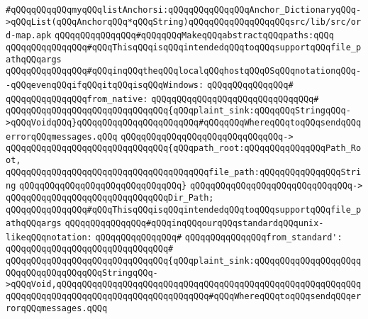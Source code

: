 \verb|#qQQqqQQqqQQqmyqQQqlistAnchorsi:qQQqqQQqqQQqqQQqAnchor_DictionaryqQQq->qQQqList(qQQqAnchorqQQq*qQQqString)qQQqqQQqqQQqqQQqqQQqsrc/lib/src/ord-map.apk|\newline
\newline
\newline
\verb|qQQqqQQqqQQqqQQq#qQQqqQQqMakeqQQqabstractqQQqpaths:qQQq|\newline
\newline
\verb|qQQqqQQqqQQqqQQq#qQQqThisqQQqisqQQqintendedqQQqtoqQQqsupportqQQqfile_pathqQQqargs|\newline
\verb|qQQqqQQqqQQqqQQq#qQQqinqQQqtheqQQqlocalqQQqhostqQQqOSqQQqnotationqQQq--qQQqevenqQQqifqQQqitqQQqisqQQqWindows:|\newline
\verb|qQQqqQQqqQQqqQQq#|\newline
\verb|qQQqqQQqqQQqqQQqfrom_native:|\newline
\verb|qQQqqQQqqQQqqQQqqQQqqQQqqQQqqQQq#|\newline
\verb|qQQqqQQqqQQqqQQqqQQqqQQqqQQqqQQq{qQQqplaint_sink:qQQqqQQqStringqQQq->qQQqVoidqQQq}qQQqqQQqqQQqqQQqqQQqqQQq#qQQqqQQqWhereqQQqtoqQQqsendqQQqerrorqQQqmessages.qQQq|\newline
\verb|qQQqqQQqqQQqqQQqqQQqqQQqqQQqqQQq->|\newline
\verb|qQQqqQQqqQQqqQQqqQQqqQQqqQQqqQQq{qQQqpath_root:qQQqqQQqqQQqqQQqPath_Root,|\newline
\verb|qQQqqQQqqQQqqQQqqQQqqQQqqQQqqQQqqQQqqQQqfile_path:qQQqqQQqqQQqqQQqString|\newline
\verb|qQQqqQQqqQQqqQQqqQQqqQQqqQQqqQQq}|\newline
\verb|qQQqqQQqqQQqqQQqqQQqqQQqqQQqqQQq->|\newline
\verb|qQQqqQQqqQQqqQQqqQQqqQQqqQQqqQQqDir_Path;|\newline
\newline
\verb|qQQqqQQqqQQqqQQq#qQQqThisqQQqisqQQqintendedqQQqtoqQQqsupportqQQqfile_pathqQQqargs|\newline
\verb|qQQqqQQqqQQqqQQq#qQQqinqQQqourqQQqstandardqQQqunix-likeqQQqnotation:|\newline
\verb|qQQqqQQqqQQqqQQq#|\newline
\verb|qQQqqQQqqQQqqQQqfrom_standard':|\newline
\verb|qQQqqQQqqQQqqQQqqQQqqQQqqQQqqQQq#|\newline
\verb|qQQqqQQqqQQqqQQqqQQqqQQqqQQqqQQq{qQQqplaint_sink:qQQqqQQqqQQqqQQqqQQqqQQqqQQqqQQqqQQqqQQqStringqQQq->qQQqVoid,qQQqqQQqqQQqqQQqqQQqqQQqqQQqqQQqqQQqqQQqqQQqqQQqqQQqqQQqqQQqqQQqqQQqqQQqqQQqqQQqqQQqqQQqqQQqqQQqqQQq#qQQqWhereqQQqtoqQQqsendqQQqerrorqQQqmessages.qQQq|\newline
